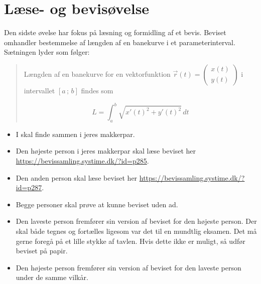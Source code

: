 \documentclass[a4paper, 12pt]{article}
\begin{document}
\newpage

\section*{Læse- og bevisøvelse}
\label{sec:org0e01825}

Den sidste øvelse har fokus på læsning og formidling af et bevis. Beviset omhandler bestemmelse af længden af en banekurve i et parameterinterval. Sætningen lyder som følger:

\begin{quote}
Længden af en banekurve for en vektorfunktion \(\vec{r}(t) = \begin{pmatrix} x(t) \\ y(t) \end{pmatrix}\) i intervallet \([a\,;\,b]\) findes som 

$$ L = \int_a^b \sqrt{ x'(t)^2 + y'(t)^2} \, dt$$
\end{quote}

\begin{itemize}
\item I skal finde sammen i jeres makkerpar.

\item Den højeste person i jeres makkerpar skal læse beviset her \url{https://bevissamling.systime.dk/?id=p285}.

\item Den anden person skal læse beviset her \url{https://bevissamling.systime.dk/?id=p287}.

\item Begge personer skal prøve at kunne beviset uden ad.

\item Den laveste person fremfører sin version af beviset for den højeste person. Der skal både tegnes og fortælles ligesom var det til en mundtlig eksamen. Det må gerne foregå på et lille stykke af tavlen. Hvis dette ikke er muligt, så udfør beviset på papir.

\item Den højeste person fremfører sin version af beviset for den laveste person under de samme vilkår.
\end{itemize}
\end{document}
